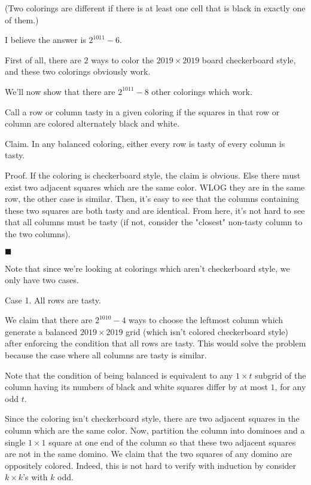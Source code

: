 \begin{shortque*}{}
{        (Two colorings are different if there is at least one cell that is black in exactly one of them.)
        }{%
        I believe the answer is $\boxed{2^{1011} - 6}.$

        First of all, there are $2$ ways to color the $2019 \times 2019$ board checkerboard style, and these two colorings obviously work.

        We'll now show that there are $2^{1011} - 8$ other colorings which work.

        Call a row or column tasty in a given coloring if the squares in that row or column are colored alternately black and white.

        Claim. In any balanced coloring, either every row is tasty of every column is tasty.

        Proof. If the coloring is checkerboard style, the claim is obvious. Else there must exist two adjacent squares which are the same color. WLOG they are in the same row, the other case is similar. Then, it's easy to see that the columns containing these two squares are both tasty and are identical. From here, it's not hard to see that all columns must be tasty (if not, consider the "closest" non-tasty column to the two columns).

        $\blacksquare$

        Note that since we're looking at colorings which aren't checkerboard style, we only have two cases.

        Case 1. All rows are tasty.

        We claim that there are $2^{1010}-4$ ways to choose the leftmost column which generate a balanced $2019 \times 2019$ grid (which isn't colored checkerboard style) after enforcing the condition that all rows are tasty. This would solve the problem because the case where all columns are tasty is similar.

        Note that the condition of being balanced is equivalent to any $1 \times t$ subgrid of the column having its numbers of black and white squares differ by at most $1$, for any odd $t.$

        Since the coloring isn't checkerboard style, there are two adjacent squares in the column which are the same color. Now, partition the column into dominoes and a single $1 \times 1$ square at one end of the column so that these two adjacent squares are not in the same domino. We claim that the two squares of any domino are oppositely colored. Indeed, this is not hard to verify with induction by consider $k \times k$'s with $k$ odd.

}
\end{shortque*}
